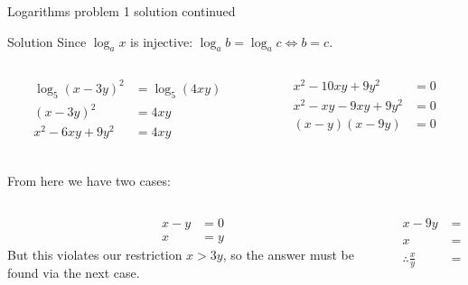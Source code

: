 \begin{namedframe}{Logarithms problem 1 solution continued}
	\begin{block}{Solution}
		Since $\log_a x$ is injective: $\log_a b = \log_a c \iff b = c$.
		\pause
		\begin{columns}[t]
			\begin{column}{0.5\textwidth}
				\begin{align*}
					\log_5(x-3y)^2    &= \log_5(4xy)\\
					(x - 3y)^2        &= 4xy\\
					x^2 - 6xy + 9y^2  &= 4xy\\
				\end{align*}
			\end{column}
			\pause
			\begin{column}{0.5\textwidth} \begin{align*} x^2 - 10xy + 9y^2 &= 0\\
					x^2 - xy - 9xy + 9y^2 &= 0\\
					(x - y)(x - 9y)   &= 0
				\end{align*}
			\end{column}
		\end{columns}
		\vspace{-2ex}
		\pause
		From here we have two cases:
		\pause
		\vspace{-3ex}
		\begin{columns}[onlytextwidth,t]
			\begin{column}{0.7\textwidth}
				\begin{align*}
					x - y &= 0\\
					x     &= y
				\end{align*}
				But this violates our restriction $x > 3y$, so the answer must be found via the next case.
			\end{column}
			\pause
			\begin{column}{0.3\textwidth}
				\begin{align*}
					x - 9y                 &= 0\\
					x                      &= 9y\\
					\therefore \frac{x}{y} &= 9
				\end{align*}
			\end{column}
		\end{columns}
	\end{block}
\end{namedframe}
